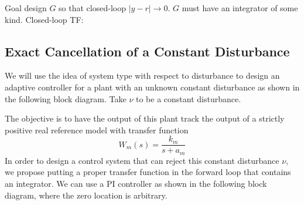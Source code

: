 Goal design $G$ so that closed-loop $|y-r|\rightarrow0$.
$G$ must have an integrator of some kind.
Closed-loop TF:\@
%

\subsection{Exact Cancellation of a Constant Disturbance}

We will use the idea of system type with respect to disturbance to design an adaptive controller for a plant with an unknown constant disturbance as shown in the following block diagram.
Take $\nu$ to be a constant disturbance.
\begin{figure}[H]
  \begin{center}
  \end{center}
\end{figure}
The objective is to have the output of this plant track the output of a strictly positive real reference model with transfer function
\begin{equation*}
  W_{m}(s)=\frac{k_{m}}{s+a_{m}}
\end{equation*}
In order to design a control system that can reject this constant disturbance $\nu$, we propose putting a proper transfer function in the forward loop that contains an integrator.
We can use a PI controller as shown in the following block diagram, where the zero location is arbitrary.

